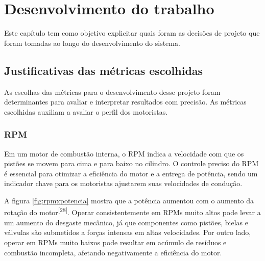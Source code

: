 \chapter{Desenvolvimento do trabalho}


Este capítulo tem como objetivo explicitar quais foram as decisões de projeto que foram tomadas ao longo do desenvolvimento do sistema.

\section{Justificativas das métricas escolhidas}

As escolhas das métricas para o desenvolvimento desse projeto foram determinantes para avaliar e interpretar resultados com precisão. As métricas escolhidas auxiliam a avaliar o perfil dos motoristas.

\subsection{RPM}

 Em um motor de combustão interna, o RPM indica a velocidade com que os pistões se movem para cima e para baixo no cilindro. O controle preciso do RPM é essencial para otimizar a eficiência do motor e a entrega de potência, sendo um indicador chave para os motoristas ajustarem suas velocidades de condução.

 A figura \ref{fig:rpmxpotencia} mostra que a potência aumentou com o aumento da rotação do motor\textsuperscript{[28]}. Operar consistentemente em RPMs muito altos pode levar a um aumento do desgaste mecânico, já que componentes como pistões, bielas e válvulas são submetidos a forças intensas em altas velocidades. Por outro lado, operar em RPMs muito baixos pode resultar em acúmulo de resíduos e combustão incompleta, afetando negativamente a eficiência do motor.

